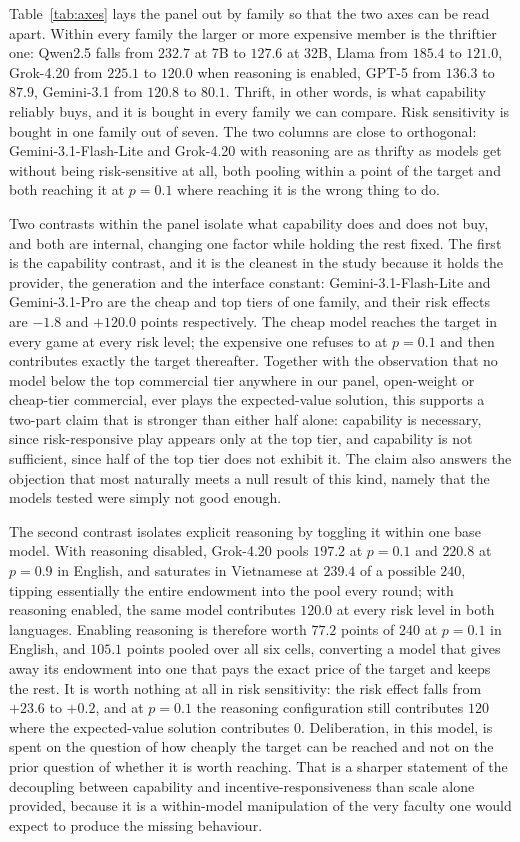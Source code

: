 \documentclass[openacc]{rsproca_new}
\begin{document}
Table~\ref{tab:axes} lays the panel out by family so that the two axes can be read apart. Within every family the larger or more expensive member is the thriftier one: Qwen2.5 falls from $232.7$ at 7B to $127.6$ at 32B, Llama from $185.4$ to $121.0$, Grok-4.20 from $225.1$ to $120.0$ when reasoning is enabled, GPT-5 from $136.3$ to $87.9$, Gemini-3.1 from $120.8$ to $80.1$. Thrift, in other words, is what capability reliably buys, and it is bought in every family we can compare. Risk sensitivity is bought in one family out of seven. The two columns are close to orthogonal: Gemini-3.1-Flash-Lite and Grok-4.20 with reasoning are as thrifty as models get without being risk-sensitive at all, both pooling within a point of the target and both reaching it at $p=0.1$ where reaching it is the wrong thing to do.

Two contrasts within the panel isolate what capability does and does not buy, and both are internal, changing one factor while holding the rest fixed. The first is the capability contrast, and it is the cleanest in the study because it holds the provider, the generation and the interface constant: Gemini-3.1-Flash-Lite and Gemini-3.1-Pro are the cheap and top tiers of one family, and their risk effects are $-1.8$ and $+120.0$ points respectively. The cheap model reaches the target in every game at every risk level; the expensive one refuses to at $p=0.1$ and then contributes exactly the target thereafter. Together with the observation that no model below the top commercial tier anywhere in our panel, open-weight or cheap-tier commercial, ever plays the expected-value solution, this supports a two-part claim that is stronger than either half alone: capability is necessary, since risk-responsive play appears only at the top tier, and capability is not sufficient, since half of the top tier does not exhibit it. The claim also answers the objection that most naturally meets a null result of this kind, namely that the models tested were simply not good enough.

The second contrast isolates explicit reasoning by toggling it within one base model. With reasoning disabled, Grok-4.20 pools $197.2$ at $p=0.1$ and $220.8$ at $p=0.9$ in English, and saturates in Vietnamese at $239.4$ of a possible $240$, tipping essentially the entire endowment into the pool every round; with reasoning enabled, the same model contributes $120.0$ at every risk level in both languages. Enabling reasoning is therefore worth $77.2$ points of $240$ at $p=0.1$ in English, and $105.1$ points pooled over all six cells, converting a model that gives away its endowment into one that pays the exact price of the target and keeps the rest. It is worth nothing at all in risk sensitivity: the risk effect falls from $+23.6$ to $+0.2$, and at $p=0.1$ the reasoning configuration still contributes $120$ where the expected-value solution contributes $0$. Deliberation, in this model, is spent on the question of how cheaply the target can be reached and not on the prior question of whether it is worth reaching. That is a sharper statement of the decoupling between capability and incentive-responsiveness than scale alone provided, because it is a within-model manipulation of the very faculty one would expect to produce the missing behaviour.
\end{document}
